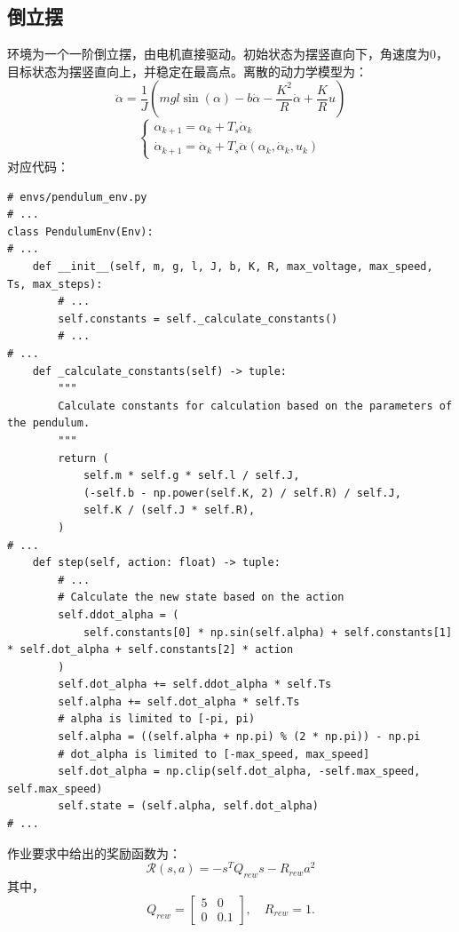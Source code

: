 \documentclass[12pt,a4paper]{article}
\begin{document}
\subsection{倒立摆}
环境为一个一阶倒立摆，由电机直接驱动。初始状态为摆竖直向下，角速度为0，目标状态为摆竖直向上，并稳定在最高点。离散的动力学模型为：
\begin{equation}
\ddot{\alpha} = \frac{1}{J} ( mgl \sin(\alpha) - b \dot{\alpha} - \frac{K^2}{R} \dot{\alpha} + \frac{K}{R} u )
\end{equation}
\begin{equation}
\begin{cases}
\alpha_{k+1} = \alpha_k + T_s \dot{\alpha}_k \\
\dot{\alpha}_{k+1} = \dot{\alpha}_k + T_s \ddot{\alpha}(\alpha_k, \dot{\alpha}_k, u_k)
\end{cases}
\end{equation}
对应代码：
\begin{lstlisting}
# envs/pendulum_env.py
# ...
class PendulumEnv(Env):
# ...
    def __init__(self, m, g, l, J, b, K, R, max_voltage, max_speed, Ts, max_steps):
        # ...
        self.constants = self._calculate_constants()
        # ...
# ...
    def _calculate_constants(self) -> tuple:
        """
        Calculate constants for calculation based on the parameters of the pendulum.
        """
        return (
            self.m * self.g * self.l / self.J,
            (-self.b - np.power(self.K, 2) / self.R) / self.J,
            self.K / (self.J * self.R),
        )
# ...
    def step(self, action: float) -> tuple:
        # ...
        # Calculate the new state based on the action
        self.ddot_alpha = (
            self.constants[0] * np.sin(self.alpha) + self.constants[1] * self.dot_alpha + self.constants[2] * action
        )
        self.dot_alpha += self.ddot_alpha * self.Ts
        self.alpha += self.dot_alpha * self.Ts
        # alpha is limited to [-pi, pi)
        self.alpha = ((self.alpha + np.pi) % (2 * np.pi)) - np.pi
        # dot_alpha is limited to [-max_speed, max_speed]
        self.dot_alpha = np.clip(self.dot_alpha, -self.max_speed, self.max_speed)
        self.state = (self.alpha, self.dot_alpha)
# ...
\end{lstlisting}

作业要求中给出的奖励函数为：
\begin{equation}
\mathcal{R}(s, a) = -s^T Q_{rew} s - R_{rew} a^2
\tag{4}
\end{equation}
其中，
\begin{equation}
Q_{rew} = 
\begin{bmatrix}
5 & 0 \\
0 & 0.1
\end{bmatrix}, \quad R_{rew} = 1.
\end{equation}
\end{document}
